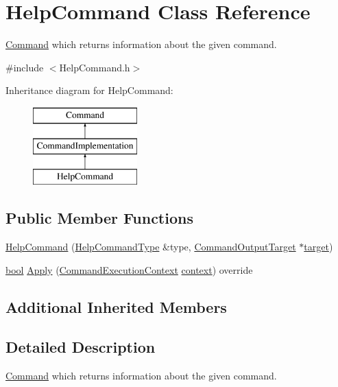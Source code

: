 \hypertarget{class_help_command}{}\section{Help\+Command Class Reference}
\label{class_help_command}


\hyperlink{class_command}{Command} which returns information about the given command.  




{\ttfamily \#include $<$Help\+Command.\+h$>$}

Inheritance diagram for Help\+Command\+:\begin{figure}[H]
\begin{center}
\leavevmode
\includegraphics[height=3.000000cm]{class_help_command}
\end{center}
\end{figure}
\subsection*{Public Member Functions}
\begin{DoxyCompactItemize}
\item 
\hyperlink{class_help_command_acbeb6397640e92f23ec634a7dfa07e06}{Help\+Command} (\hyperlink{class_help_command_type}{Help\+Command\+Type} \&type, \hyperlink{class_command_output_target}{Command\+Output\+Target} $\ast$\hyperlink{lib_2expat_8h_a15a257516a87decb971420e718853137}{target})
\item 
\hyperlink{mac_2config_2i386_2lib-src_2libsoxr_2soxr-config_8h_abb452686968e48b67397da5f97445f5b}{bool} \hyperlink{class_help_command_aeb5b09733b49f849998179e36ca66cc2}{Apply} (\hyperlink{class_command_execution_context}{Command\+Execution\+Context} \hyperlink{structcontext}{context}) override
\end{DoxyCompactItemize}
\subsection*{Additional Inherited Members}


\subsection{Detailed Description}
\hyperlink{class_command}{Command} which returns information about the given command. 

